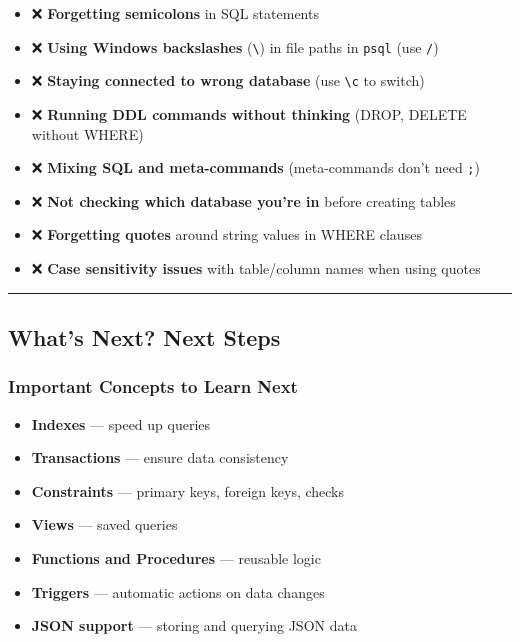 \documentclass[
  letterpaper,
  DIV=11,
  numbers=noendperiod]{scrartcl}
\providecommand{\tightlist}{%
  \setlength{\itemsep}{0pt}\setlength{\parskip}{0pt}}\usepackage{longtable,booktabs,array}
\begin{document}
\begin{itemize}
\tightlist
\item
  ❌ \textbf{Forgetting semicolons} in SQL statements
\item
  ❌ \textbf{Using Windows backslashes} (\texttt{\textbackslash{}}) in
  file paths in \texttt{psql} (use \texttt{/})
\item
  ❌ \textbf{Staying connected to wrong database} (use
  \texttt{\textbackslash{}c} to switch)
\item
  ❌ \textbf{Running DDL commands without thinking} (DROP, DELETE
  without WHERE)
\item
  ❌ \textbf{Mixing SQL and meta-commands} (meta-commands don't need
  \texttt{;})
\item
  ❌ \textbf{Not checking which database you're in} before creating
  tables
\item
  ❌ \textbf{Forgetting quotes} around string values in WHERE clauses
\item
  ❌ \textbf{Case sensitivity issues} with table/column names when using
  quotes
\end{itemize}

\begin{center}\rule{0.5\linewidth}{0.5pt}\end{center}

\subsection{What's Next? Next Steps}\label{whats-next-next-steps}

\subsubsection{Important Concepts to Learn
Next}\label{important-concepts-to-learn-next}

\begin{itemize}
\tightlist
\item
  \textbf{Indexes} --- speed up queries
\item
  \textbf{Transactions} --- ensure data consistency
\item
  \textbf{Constraints} --- primary keys, foreign keys, checks
\item
  \textbf{Views} --- saved queries
\item
  \textbf{Functions and Procedures} --- reusable logic
\item
  \textbf{Triggers} --- automatic actions on data changes
\item
  \textbf{JSON support} --- storing and querying JSON data
\end{itemize}
\end{document}
